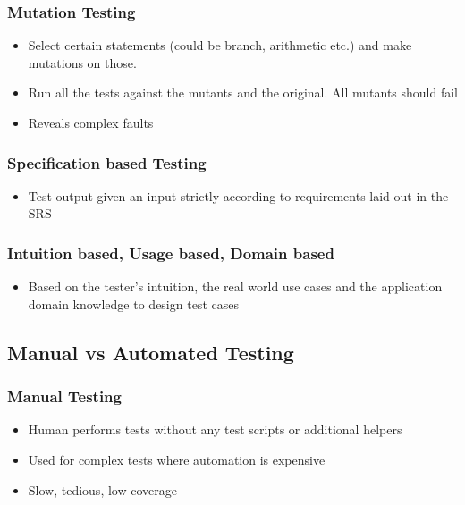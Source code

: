 \documentclass{article}
\begin{document}
\subsubsection{Mutation Testing}
\begin{itemize}
    \item Select certain statements (could be branch, arithmetic etc.) and make mutations on those. 
    
    \item Run all the tests against the mutants and the original. All mutants should fail 
    
    \item Reveals complex faults
\end{itemize}

\subsubsection{Specification based Testing}
\begin{itemize}
    \item Test output given an input strictly according to requirements laid out in the SRS
\end{itemize}

\subsubsection{Intuition based, Usage based, Domain based}
\begin{itemize}
    \item Based on the tester's intuition, the real world use cases and the application domain knowledge to design test cases
\end{itemize}

\subsection{Manual vs Automated Testing}
\subsubsection{Manual Testing}
\begin{itemize}
    \item Human performs tests without any test scripts or additional helpers
    
    \item Used for complex tests where automation is expensive
    
    \item Slow, tedious, low coverage
\end{itemize}
\end{document}
